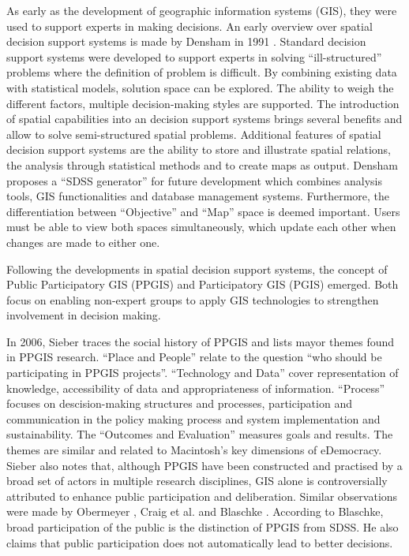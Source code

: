 As early as the development of geographic information systems (GIS), they were used to support experts in making decisions. An early overview over spatial decision support systems is made by Densham in 1991 \cite{densham_sdss}. Standard decision support systems were developed to support experts in solving ``ill-structured'' problems where the definition of problem is difficult. By combining existing data with statistical models, solution space can be explored. The ability to weigh the different factors, multiple decision-making styles are supported. The introduction of spatial capabilities into an decision support systems brings several benefits and allow to solve semi-structured spatial problems. Additional features of spatial decision support systems are the ability to store and illustrate spatial relations, the analysis through statistical methods and to create maps as output. Densham proposes a ``SDSS generator'' for future development which combines analysis tools, GIS functionalities and database management systems. Furthermore, the differentiation between ``Objective'' and ``Map'' space is deemed important. Users must be able to view both spaces simultaneously, which update each other when changes are made to either one.

Following the developments in spatial decision support systems, the concept of Public Participatory GIS (PPGIS) and Participatory GIS (PGIS) emerged. Both focus on enabling non-expert groups to apply GIS technologies to strengthen involvement in decision making.

In 2006, Sieber \cite{Sieber2006_PublicParticipationGIS} traces the social history of PPGIS and lists mayor themes found in PPGIS research. ``Place and People'' relate to the question ``who should be participating in PPGIS projects''. ``Technology and Data'' cover representation of knowledge, accessibility of data and appropriateness of information. ``Process'' focuses on descision-making structures and processes, participation and communication in the policy making process and system implementation and sustainability. The ``Outcomes and Evaluation'' measures goals and results. The themes are similar and related to Macintosh's \cite{Macintosh2004_eParticipation_characterization} key dimensions of eDemocracy. Sieber also notes that, although PPGIS have been constructed and practised by a broad set of actors in multiple research disciplines, GIS alone is controversially attributed to enhance public participation and deliberation. Similar observations were made by Obermeyer \cite{obermeyer1998evolution}, Craig et al. \cite{Weiner2002_Participation_and_GIS_eigentlich_Craig} and Blaschke \cite{Blaschke2004_PGIS_critically_revised}. According to Blaschke, broad participation of the public is the distinction of PPGIS from SDSS. He also claims that public participation does not automatically lead to better decisions.

